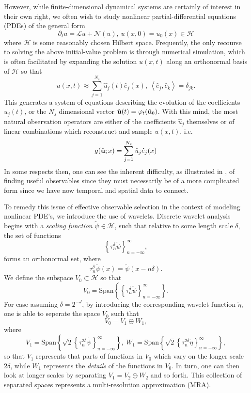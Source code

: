 \documentclass[a4paper,11pt]{article}
\newcommand{\pd}{\partial}
\begin{document}
However, while finite-dimensional dynamical systems are certainly of interest in their own right, we often wish to study nonlinear partial-differential equations (PDEs) of the general form 
\[
\pd_{t} u = \mathcal{L} u + \mathcal{N}(u), ~ u(x,0) = u_{0}(x) \in \mathcal{H}
\]
where $\mathcal{H}$ is some reasonably chosen Hilbert space.  Frequently, the only recourse to solving the above initial-value problem is through numerical simulation, which is often facilitated by expanding the solution $u(x,t)$ along an orthonormal basis of $\mathcal{H}$ so that 
\[
u(x,t) \approx \sum_{j=1}^{N_{s}} \hat{u}_{j}(t) \hat{e}_{j}(x), ~ \left<\hat{e}_{j},\hat{e}_{k} \right> = \delta_{jk}.
\]
This generates a system of equations describing the evolution of the coefficients $\hat{u}_{j}(t)$, or the $N_{s}$ dimensional vector $\hat{{\bf u}}(t) = \varphi_{t}(\hat{{\bf u}}_{0})$.  With this mind, the most natural observation operators are either of the coefficients $\hat{u}_{j}$ themselves or of linear combinations which reconstruct and sample $u(x,t)$, i.e. 
\[
g(\hat{{\bf u}};x) = \sum_{j=1}^{N_{s}}\hat{u}_{j} \hat{e}_{j}(x)
\]
In some respects then, one can see the inherent difficulty, as illustrated in \cite{kutz2}, of finding useful observables since they must necessarily be of a more complicated form since we have now temporal and spatial data to connect.  

To remedy this issue of effective observable selection in the context of modeling nonlinear PDE's, we introduce the use of wavelets.  Discrete wavelet analysis begins with a {\it scaling function} $\tilde{\psi}\in \mathcal{H}$, such that relative to some length scale $\delta$, the set of functions 
\[
\left\{\tau^{\delta}_{n}\tilde{\psi}\right\}_{n=-\infty}^{\infty},
\]
forms an orthonormal set, where
\[
\tau^{\delta}_{n}\tilde{\psi}(x) = \tilde{\psi}\left(x - n\delta\right).
\]
We define the subspace $V_{0} \subset \mathcal{H}$ so that 
\[
V_{0} = \mbox{Span}\left\{\left\{\tau^{\delta}_{n}\tilde{\psi}\right\}_{n=-\infty}^{\infty}\right\}.
\]
For ease assuming $\delta = 2^{-J}$, by introducing the corresponding wavelet function $\tilde{\eta}$, one is able to seperate the space $V_{0}$ such that 
\[
V_{0} = V_{1} \oplus W_{1}, 
\]
where
\[
V_{1} = \mbox{Span}\left\{ \sqrt{2}\left\{\tau^{2\delta}_{n}\tilde{\psi}\right\}_{n=-\infty}^{\infty}\right\}, ~ W_{1} = \mbox{Span}\left\{ \sqrt{2}\left\{\tau^{2\delta}_{n}\tilde{\eta}\right\}_{n=-\infty}^{\infty}\right\},
\]
so that $V_{1}$ represents that parts of functions in $V_{0}$ which vary on the longer scale $2\delta$, while $W_{1}$ represents the {\it details} of the functions in $V_{0}$.  In turn, one can then look at longer scales by separating $V_{1} = V_{2} \oplus W_{2}$ and so forth.  This collection of separated spaces represents a multi-resolution approximation (MRA).   
\end{document}
